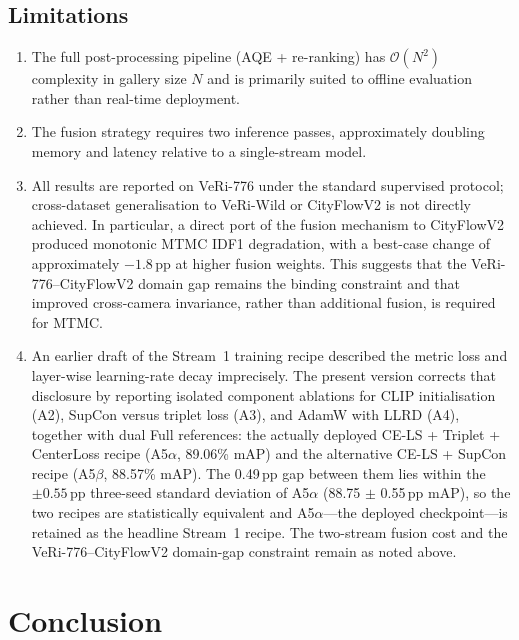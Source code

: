 \documentclass[11pt]{article}
\begin{document}
\subsection{Limitations}
\begin{enumerate}
  \item The full post-processing pipeline (AQE + re-ranking) has
    $\mathcal{O}(N^{2})$ complexity in gallery size $N$ and is primarily suited
    to offline evaluation rather than real-time deployment.
  \item The fusion strategy requires two inference passes, approximately
    doubling memory and latency relative to a single-stream model.
  \item All results are reported on VeRi-776 under the standard supervised
    protocol; cross-dataset generalisation to VeRi-Wild or CityFlowV2 is not
    directly achieved. In particular, a direct port of the fusion mechanism to
    CityFlowV2 produced monotonic MTMC IDF1 degradation, with a best-case
    change of approximately $-1.8$\,pp at higher fusion weights. This suggests
    that the VeRi-776--CityFlowV2 domain gap remains the binding constraint and
    that improved cross-camera invariance, rather than additional fusion, is
    required for MTMC.
  \item An earlier draft of the Stream~1 training recipe described the metric
    loss and layer-wise learning-rate decay imprecisely. The present version
    corrects that disclosure by reporting isolated component ablations for
    CLIP initialisation (A2), SupCon versus triplet loss (A3), and AdamW with
    LLRD (A4), together with dual Full references: the actually deployed
    CE-LS + Triplet + CenterLoss recipe (A5$\alpha$, 89.06\% mAP) and the
    alternative CE-LS + SupCon recipe (A5$\beta$, 88.57\% mAP). The
    0.49\,pp gap between them lies within the $\pm 0.55$\,pp three-seed
    standard deviation of A5$\alpha$ (88.75 $\pm$ 0.55\,pp mAP), so the two
    recipes are statistically equivalent and A5$\alpha$---the deployed
    checkpoint---is retained as the headline Stream~1 recipe. The two-stream
    fusion cost and the VeRi-776--CityFlowV2 domain-gap constraint remain
    as noted above.
\end{enumerate}

\section{Conclusion}
\label{sec:conclusion}
\end{document}
